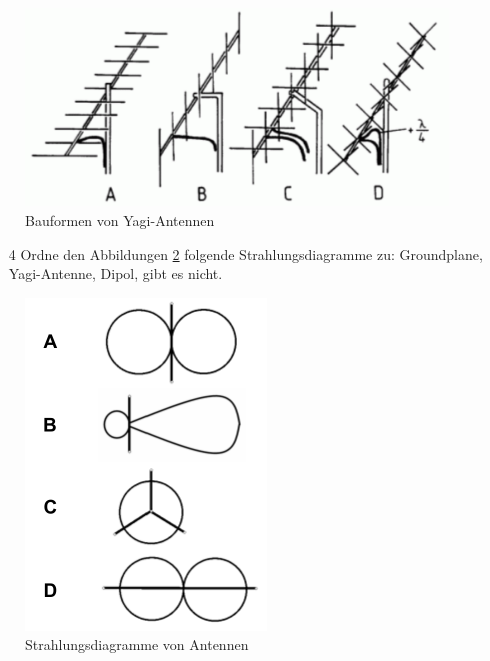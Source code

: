 \begin{figure}[H]
	\centering
	\includegraphics[scale=0.4]{Antennen/Bilder/TH209.pdf}
	\caption{Bauformen von Yagi-Antennen}
	\label{yagi}
\end{figure}
\begin{enumerate} 
\itemsep1pt\parskip0pt
\item[4] Ordne den Abbildungen \ref{strahlungsdiagramm} folgende Strahlungsdiagramme zu: Groundplane, Yagi-Antenne, Dipol, gibt es nicht.
\end{enumerate}

\begin{figure}[H]
	\centering
	\includegraphics[scale=0.8]{Antennen/Bilder/Strahlungsdiagramm.pdf}
	\caption{Strahlungsdiagramme von Antennen}
	\label{strahlungsdiagramm}
\end{figure}


